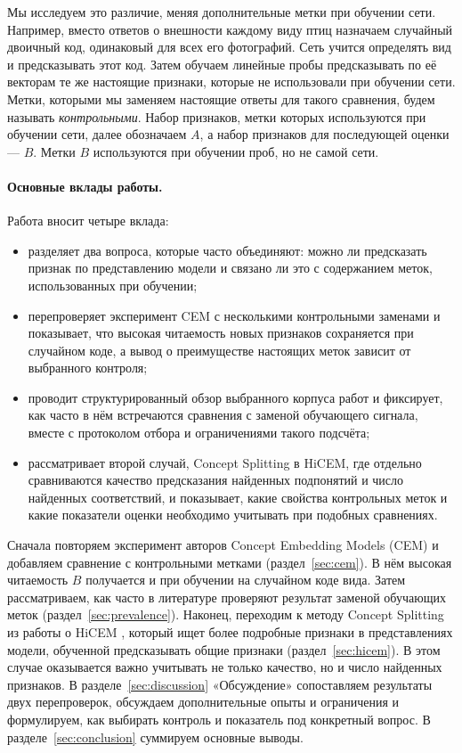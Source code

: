 \documentclass[10pt]{article}
\begin{document}
Мы исследуем это различие, меняя дополнительные метки при обучении сети. Например, вместо ответов о внешности каждому виду птиц назначаем случайный двоичный код, одинаковый для всех его фотографий. Сеть учится определять вид и предсказывать этот код. Затем обучаем линейные пробы предсказывать по её векторам те же настоящие признаки, которые не использовали при обучении сети. Метки, которыми мы заменяем настоящие ответы для такого сравнения, будем называть \emph{контрольными}. Набор признаков, метки которых используются при обучении сети, далее обозначаем $A$, а набор признаков для последующей оценки --- $B$. Метки $B$ используются при обучении проб, но не самой сети.

\paragraph{Основные вклады работы.}
Работа вносит четыре вклада:
\begin{itemize}
\item разделяет два вопроса, которые часто объединяют: можно ли предсказать признак по представлению модели и связано ли это с содержанием меток, использованных при обучении;
\item перепроверяет эксперимент CEM с несколькими контрольными заменами и показывает, что высокая читаемость новых признаков сохраняется при случайном коде, а вывод о преимуществе настоящих меток зависит от выбранного контроля;
\item проводит структурированный обзор выбранного корпуса работ и фиксирует, как часто в нём встречаются сравнения с заменой обучающего сигнала, вместе с протоколом отбора и ограничениями такого подсчёта;
\item рассматривает второй случай, Concept Splitting в HiCEM, где отдельно сравниваются качество предсказания найденных подпонятий и число найденных соответствий, и показывает, какие свойства контрольных меток и какие показатели оценки необходимо учитывать при подобных сравнениях.
\end{itemize}

Сначала повторяем эксперимент авторов Concept Embedding Models (CEM) и добавляем сравнение с контрольными метками (раздел~\ref{sec:cem}). В нём высокая читаемость $B$ получается и при обучении на случайном коде вида. Затем рассматриваем, как часто в литературе проверяют результат заменой обучающих меток (раздел~\ref{sec:prevalence}). Наконец, переходим к методу Concept Splitting из работы о HiCEM \citep{hicem}, который ищет более подробные признаки в представлениях модели, обученной предсказывать общие признаки (раздел~\ref{sec:hicem}). В этом случае оказывается важно учитывать не только качество, но и число найденных признаков. В разделе~\ref{sec:discussion} «Обсуждение» сопоставляем результаты двух перепроверок, обсуждаем дополнительные опыты и ограничения и формулируем, как выбирать контроль и показатель под конкретный вопрос. В разделе~\ref{sec:conclusion} суммируем основные выводы.
\end{document}
